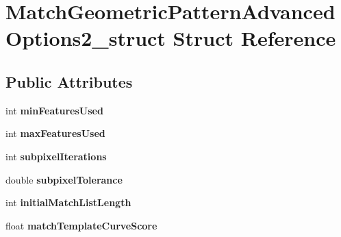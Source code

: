 \hypertarget{structMatchGeometricPatternAdvancedOptions2__struct}{\section{\-Match\-Geometric\-Pattern\-Advanced\-Options2\-\_\-struct \-Struct \-Reference}
\label{structMatchGeometricPatternAdvancedOptions2__struct}
}
\subsection*{\-Public \-Attributes}
\begin{DoxyCompactItemize}
\item 
\hypertarget{structMatchGeometricPatternAdvancedOptions2__struct_aad6d565ae9492f6e58c5221c38693d53}{int {\bfseries min\-Features\-Used}}\label{structMatchGeometricPatternAdvancedOptions2__struct_aad6d565ae9492f6e58c5221c38693d53}

\item 
\hypertarget{structMatchGeometricPatternAdvancedOptions2__struct_a36097448147ee2536708477c3823155b}{int {\bfseries max\-Features\-Used}}\label{structMatchGeometricPatternAdvancedOptions2__struct_a36097448147ee2536708477c3823155b}

\item 
\hypertarget{structMatchGeometricPatternAdvancedOptions2__struct_a479b91cb231de6e67e9e1d061289b144}{int {\bfseries subpixel\-Iterations}}\label{structMatchGeometricPatternAdvancedOptions2__struct_a479b91cb231de6e67e9e1d061289b144}

\item 
\hypertarget{structMatchGeometricPatternAdvancedOptions2__struct_a1af9de9fb6c16afaa2cf2bee12603340}{double {\bfseries subpixel\-Tolerance}}\label{structMatchGeometricPatternAdvancedOptions2__struct_a1af9de9fb6c16afaa2cf2bee12603340}

\item 
\hypertarget{structMatchGeometricPatternAdvancedOptions2__struct_a41b0bf9c9b5d42af21b53162c9dbab16}{int {\bfseries initial\-Match\-List\-Length}}\label{structMatchGeometricPatternAdvancedOptions2__struct_a41b0bf9c9b5d42af21b53162c9dbab16}

\item 
\hypertarget{structMatchGeometricPatternAdvancedOptions2__struct_a6d6369b770e46d86ea6f2c9bcd5223ac}{float {\bfseries match\-Template\-Curve\-Score}}\label{structMatchGeometricPatternAdvancedOptions2__struct_a6d6369b770e46d86ea6f2c9bcd5223ac}


\end{DoxyCompactItemize}

